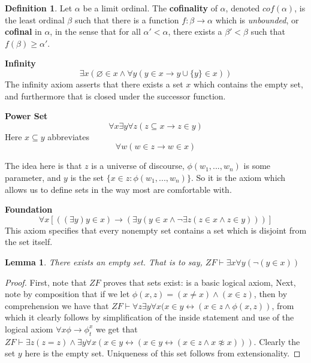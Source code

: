 \documentclass{article}
\theoremstyle{definition}
\newtheorem{definition}{Definition}[section]
\theoremstyle{plain}
\theoremstyle{theorem}
\newtheorem{lemma}{Lemma}[section]
\begin{document}
\begin{definition}
Let $\alpha$ be a limit ordinal. The \textbf{cofinality} of $\alpha$, denoted $cof(\alpha)$, is the least ordinal $\beta$ such that there is a function $f:\beta \to \alpha$ which is \textit{unbounded}, or \textbf{cofinal} in $\alpha$, in the sense that for all $\alpha' < \alpha$, there exists a $\beta' < \beta$ such that $f(\beta) \geq \alpha'$. 
\end{definition}


\par \textbf{Infinity} \[\exists x (\varnothing \in x \wedge \forall y (y \in x \rightarrow y \cup \{y\} \in x)) \]The infinity axiom asserts that there exists a set $x$ which contains the empty set, and furthermore that is closed under the successor function.
\par \textbf{Power Set} \[\forall x \exists y \forall z (z \subseteq x \rightarrow z \in y) \]
	Here $x \subseteq y$ abbreviates \[\forall w (w \in z \rightarrow w \in x)\] 

	The idea here is that $z$ is a universe of discourse, $\phi(w_1,...,w_n)$ is some parameter, and $y$ is the set $\{x \in z: \phi(w_1,...,w_n)\}$. So it is the axiom which allows us to define sets in the way most are comfortable with.
\par \textbf{Foundation}
	\[ \forall x [((\exists y)y \in x) \rightarrow (\exists y(y \in x \wedge \neg \exists z (z \in x \wedge z \in y)))] \]
	This axiom specifies that every nonempty set contains a set which is disjoint from the set itself.
\begin{lemma}
	There exists an empty set. That is to say, $ZF \vdash \exists x \forall y (\neg (y \in x))$
\end{lemma}
\begin{proof}
	First, note that $ZF$ proves that sets exist:  is a basic logical axiom,  Next, note by composition that if we let $\phi(x,z) = (x \neq x) \wedge (x \in z)$, then by comprehension we have that $ZF \vdash \forall z \exists y \forall x (x \in y \leftrightarrow (x \in z \wedge \phi(x,z))$, from which it clearly follows by simplification of the inside statement and use of the logical axiom $\forall x \phi \rightarrow \phi_t^x$ we get that $ZF \vdash \exists z(z = z) \wedge \exists y \forall x (x \in y \leftrightarrow (x \in y \leftrightarrow (x \in z \wedge x \not\approx x)))$. Clearly the set $y$ here is the empty set. Uniqueness of this set follows from extensionality.  
\end{proof}
\end{document}
